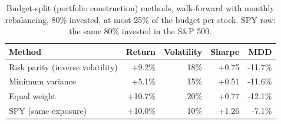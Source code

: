 \begin{table}[H]
\centering
\small
\caption{Budget-split (portfolio construction) methods, walk-forward with monthly rebalancing, 80\% invested, at most 25\% of the budget per stock. SPY row: the same 80\% invested in the S\&P 500.}
\label{tab:ext-alloc}
\begin{tabular}{lrrrr}
\toprule
Method & Return & Volatility & Sharpe & MDD \\
\midrule
Risk parity (inverse volatility) & +9.2\% & 18\% & +0.75 & -11.7\% \\
Minimum variance & +5.1\% & 15\% & +0.51 & -11.6\% \\
Equal weight & +10.7\% & 20\% & +0.77 & -12.1\% \\
SPY (same exposure) & +10.0\% & 10\% & +1.26 & -7.1\% \\
\bottomrule
\end{tabular}
\end{table}
